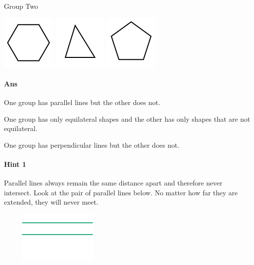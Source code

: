 \documentclass[twocolumn,10pt]{article}
\def\shrinkfactor{0.55}
\begin{document}
Group Two


\includegraphics[scale=\shrinkfactor]{figures/0245164f3f4897772e76d361f955075a80732b03.png} 
\includegraphics[scale=\shrinkfactor]{figures/ee7f87a00acb47dec4f2b2eed9a6741b21afc47d.png} 
\includegraphics[scale=\shrinkfactor]{figures/498a6b09730fdba2360826c138eeee142e8cccc1.png}


\paragraph{Ans} 

One group has parallel lines but the other does not.

One group has only equilateral shapes and the other has only shapes that are not equilateral.


 One group has perpendicular lines but the other does not.



\paragraph{Hint 1}Parallel lines always remain the same distance apart and therefore never intersect.  Look at the pair of parallel lines below.  No matter how far they are extended, they will never meet.

$\phantom{xxxx}$
\includegraphics[scale=\shrinkfactor]{figures/7cf1fbfb7516a57d37ad80007a3886c81c33f393.png}  
\end{document}

